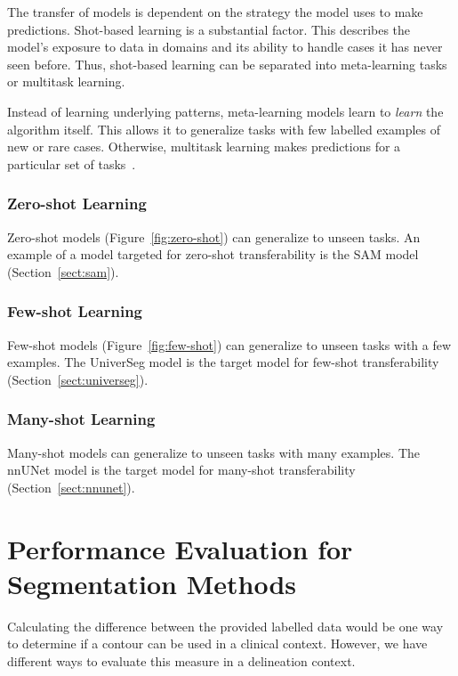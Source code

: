 \documentclass[12pt,twoside]{report}
\begin{document}
The transfer of models is dependent on the strategy the model uses to make predictions. Shot-based learning is a substantial factor. This describes the model's exposure to data in domains and its ability to handle cases it has never seen before. Thus, shot-based learning can be separated into meta-learning tasks or multitask learning. 

Instead of learning underlying patterns, meta-learning models learn to \textit{learn} the algorithm itself. This allows it to generalize tasks with few labelled examples of new or rare cases. Otherwise, multitask learning makes predictions for a particular set of tasks~\cite{deep-learning-book}.

\subsubsection{Zero-shot Learning}\label{sect:zero-shot-learning}

Zero-shot models (Figure~\ref{fig:zero-shot}) can generalize to unseen tasks. An example of a model targeted for zero-shot transferability is the SAM model (Section~\ref{sect:sam}).

\subsubsection{Few-shot Learning}\label{sect:few-shot-learning}

Few-shot models (Figure~\ref{fig:few-shot}) can generalize to unseen tasks with a few examples. The UniverSeg model is the target model for few-shot transferability (Section~\ref{sect:universeg}).

\subsubsection{Many-shot Learning}\label{sect:many-shot-learning}

Many-shot models can generalize to unseen tasks with many examples. The nnUNet model is the target model for many-shot transferability (Section~\ref{sect:nnunet}).

\section{Performance Evaluation for Segmentation Methods}\label{sect:performance-evaluation}

Calculating the difference between the provided labelled data would be one way to determine if a contour can be used in a clinical context. However, we have different ways to evaluate this measure in a delineation context.
\end{document}
